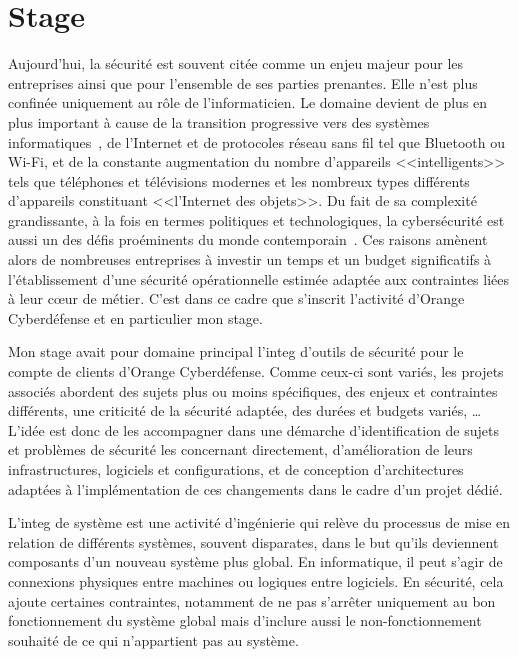\documentclass[12pt, oneside, a4paper, titlepage]{report}
\begin{document}
\section{Stage}%
\label{sec:intro::stage}

Aujourd'hui, la sécurité est souvent citée comme un enjeu majeur pour les
entreprises ainsi que pour l'ensemble de ses parties prenantes. Elle n'est plus
confinée uniquement au rôle de l'informaticien. Le domaine devient de plus en
plus important à cause de la transition progressive vers des systèmes
informatiques~\cite{reliance}, de l'Internet et de protocoles réseau sans fil
tel que Bluetooth ou Wi-Fi, et de la constante augmentation du nombre
d'appareils <<intelligents>> tels que téléphones et télévisions modernes et les
nombreux types différents d'appareils constituant <<l'Internet des objets>>. Du
fait de sa complexité grandissante, à la fois en termes politiques et
technologiques, la cybersécurité est aussi un des défis proéminents du monde
contemporain~\cite{global-cyber}. Ces raisons amènent alors de nombreuses
entreprises à investir un temps et un budget significatifs à l'établissement
d'une sécurité opérationnelle estimée adaptée aux contraintes liées à leur cœur
de métier. C'est dans ce cadre que s'inscrit l'activité d'Orange Cyberdéfense et
en particulier mon stage.

Mon stage avait pour domaine principal l'\gls{integ} d'outils de sécurité pour
le compte de clients d'Orange Cyberdéfense. Comme ceux-ci sont variés, les
projets associés abordent des sujets plus ou moins spécifiques, des enjeux et
contraintes différents, une criticité de la sécurité adaptée, des durées et
budgets variés, \ldots{} L'idée est donc de les accompagner dans une démarche
d'identification de sujets et problèmes de sécurité les concernant directement,
d'amélioration de leurs infrastructures, logiciels et configurations, et de
conception d'architectures adaptées à l'implémentation de ces changements dans
le cadre d'un projet dédié.

L'\gls{integ} de système est une activité d'ingénierie qui relève du processus
de mise en relation de différents systèmes, souvent disparates, dans le but
qu'ils deviennent composants d'un nouveau système plus global. En informatique,
il peut s'agir de connexions physiques entre machines ou logiques entre
logiciels. En sécurité, cela ajoute certaines contraintes, notamment de ne pas
s'arrêter uniquement au bon fonctionnement du système global mais d'inclure
aussi le non-fonctionnement souhaité de ce qui n'appartient pas au système.
\end{document}
